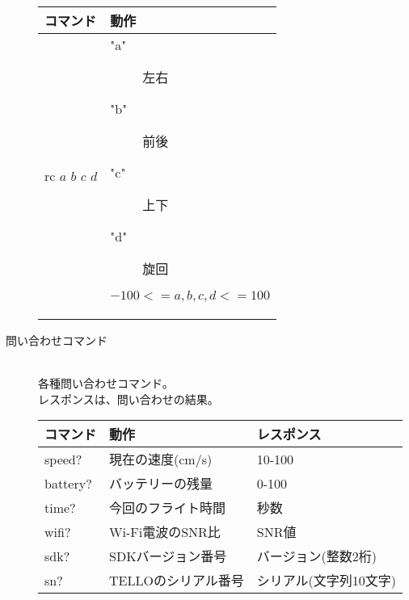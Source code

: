 \documentclass[a4paper, 12pt]{ltjsarticle}
\begin{document}
\begin{description}
        \begin{table}[h]
            \hspace{3\zw}
            \begin{tabular}{ll}
                \hline
                コマンド & 動作 \\ \hline \hline
                rc \(a\) \(b\) \(c\) \(d\) &
                \begin{minipage}{0.45\textwidth}
                    \vspace{0.5\zh}
                    \begin{description}
                        \item["a"] 左右 
                        \item["b"] 前後
                        \item["c"] 上下
                        \item["d"] 旋回
                    \end{description}
                    \( -100 <= a,b,c,d <= 100 \)
                    \vspace{0.5\zh}
                \end{minipage} \\ \hline
            \end{tabular}
        \end{table}
        \clearpage
    \item[問い合わせコマンド]\mbox{} \\
        各種問い合わせコマンド。\\
        レスポンスは、問い合わせの結果。
        \begin{table}[h]
            \hspace{3\zw}
            \begin{tabular}{lll}
                コマンド & 動作 & レスポンス \\ \hline \hline
                speed? & 現在の速度(cm/s) & 10-100 \\ \hline
                battery? & バッテリーの残量 & 0-100 \\ \hline
                time? & 今回のフライト時間 & 秒数 \\ \hline
                wifi? & Wi-Fi電波のSNR比 & SNR値 \\ \hline
                sdk? & SDKバージョン番号 & バージョン(整数2桁) \\ \hline
                sn? & TELLOのシリアル番号 & シリアル(文字列10文字) \\ \hline
            \end{tabular}
        \end{table}
\end{description}
\clearpage
\end{document}
